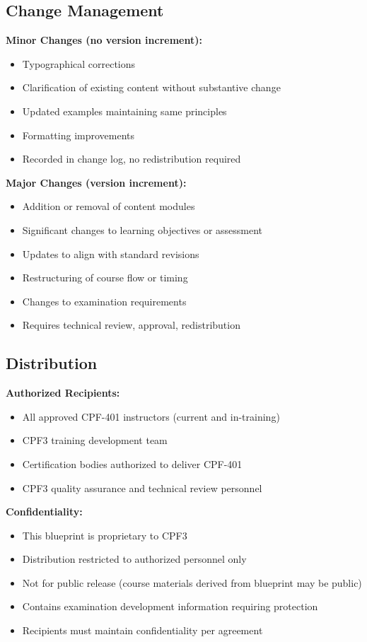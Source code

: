 \documentclass[11pt,a4paper]{article}
\begin{document}
\subsection{Change Management}

\textbf{Minor Changes (no version increment):}
\begin{itemize}
\item Typographical corrections
\item Clarification of existing content without substantive change
\item Updated examples maintaining same principles
\item Formatting improvements
\item Recorded in change log, no redistribution required
\end{itemize}

\textbf{Major Changes (version increment):}
\begin{itemize}
\item Addition or removal of content modules
\item Significant changes to learning objectives or assessment
\item Updates to align with standard revisions
\item Restructuring of course flow or timing
\item Changes to examination requirements
\item Requires technical review, approval, redistribution
\end{itemize}

\subsection{Distribution}

\textbf{Authorized Recipients:}
\begin{itemize}
\item All approved CPF-401 instructors (current and in-training)
\item CPF3 training development team
\item Certification bodies authorized to deliver CPF-401
\item CPF3 quality assurance and technical review personnel
\end{itemize}

\textbf{Confidentiality:}
\begin{itemize}
\item This blueprint is proprietary to CPF3
\item Distribution restricted to authorized personnel only
\item Not for public release (course materials derived from blueprint may be public)
\item Contains examination development information requiring protection
\item Recipients must maintain confidentiality per agreement
\end{itemize}
\end{document}
